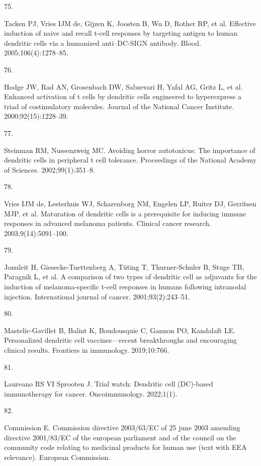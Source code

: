 \documentclass[
]{article}
\newlength{\cslhangindent}
\newlength{\csllabelwidth}
\newenvironment{CSLReferences}[2] %
 {\begin{list}{}{%
  \setlength{\itemindent}{0pt}
  \setlength{\leftmargin}{0pt}
  \setlength{\parsep}{0pt}
  \ifodd #1
   \setlength{\leftmargin}{\cslhangindent}
   \setlength{\itemindent}{-1\cslhangindent}
  \fi
  \setlength{\itemsep}{#2\baselineskip}}}
 {\end{list}}
\newcommand{\CSLLeftMargin}[1]{\parbox[t]{\csllabelwidth}{\strut#1\strut}}
\newcommand{\CSLRightInline}[1]{\parbox[t]{\linewidth - \csllabelwidth}{\strut#1\strut}}
\begin{document}
\begin{CSLReferences}{0}{1}
\CSLLeftMargin{75. }%
\CSLRightInline{Tacken PJ, Vries IJM de, Gijzen K, Joosten B, Wu D,
Rother RP, et al. Effective induction of naive and recall t-cell
responses by targeting antigen to human dendritic cells via a humanized
anti--DC-SIGN antibody. Blood. 2005;106(4):1278--85. }

\CSLLeftMargin{76. }%
\CSLRightInline{Hodge JW, Rad AN, Grosenbach DW, Sabzevari H, Yafal AG,
Gritz L, et al. Enhanced activation of t cells by dendritic cells
engineered to hyperexpress a triad of costimulatory molecules. Journal
of the National Cancer Institute. 2000;92(15):1228--39. }

\CSLLeftMargin{77. }%
\CSLRightInline{Steinman RM, Nussenzweig MC. Avoiding horror
autotoxicus: The importance of dendritic cells in peripheral t cell
tolerance. Proceedings of the National Academy of Sciences.
2002;99(1):351--8. }

\CSLLeftMargin{78. }%
\CSLRightInline{Vries IJM de, Lesterhuis WJ, Scharenborg NM, Engelen LP,
Ruiter DJ, Gerritsen MJP, et al. Maturation of dendritic cells is a
prerequisite for inducing immune responses in advanced melanoma
patients. Clinical cancer research. 2003;9(14):5091--100. }

\CSLLeftMargin{79. }%
\CSLRightInline{Jonuleit H, Giesecke-Tuettenberg A, Tüting T,
Thurner-Schuler B, Stuge TB, Paragnik L, et al. A comparison of two
types of dendritic cell as adjuvants for the induction of
melanoma-specific t-cell responses in humans following intranodal
injection. International journal of cancer. 2001;93(2):243--51. }

\CSLLeftMargin{80. }%
\CSLRightInline{Mastelic-Gavillet B, Balint K, Boudousquie C, Gannon PO,
Kandalaft LE. Personalized dendritic cell vaccines---recent
breakthroughs and encouraging clinical results. Frontiers in immunology.
2019;10:766. }

\CSLLeftMargin{81. }%
\CSLRightInline{Laureano RS VI Sprooten J. Trial watch: Dendritic cell
(DC)-based immunotherapy for cancer. Oncoimmunology. 2022;1(1). }

\CSLLeftMargin{82. }%
\CSLRightInline{Commission E. Commission directive 2003/63/EC of 25 june
2003 amending directive 2001/83/EC of the european parliament and of the
council on the community code relating to medicinal products for human
use (text with EEA relevance). European Commission. }


\end{CSLReferences}
\end{document}
